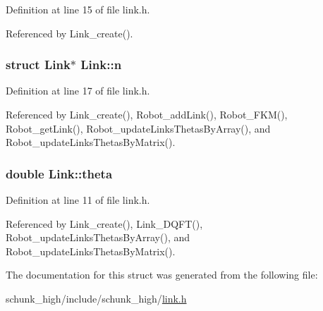 Definition at line 15 of file link.\-h.



Referenced by Link\-\_\-create().

\hypertarget{structLink_a185503cf680f8e9395c19c0521997c5c}{
\subsubsection[{n}]{\setlength{\rightskip}{0pt plus 5cm}struct {\bf Link}$\ast$ Link\-::n}}\label{structLink_a185503cf680f8e9395c19c0521997c5c}


Definition at line 17 of file link.\-h.



Referenced by Link\-\_\-create(), Robot\-\_\-add\-Link(), Robot\-\_\-\-F\-K\-M(), Robot\-\_\-get\-Link(), Robot\-\_\-update\-Links\-Thetas\-By\-Array(), and Robot\-\_\-update\-Links\-Thetas\-By\-Matrix().

\hypertarget{structLink_a88e705bc7fb6c7c8c7fa6987b52667d6}{
\subsubsection[{theta}]{\setlength{\rightskip}{0pt plus 5cm}double Link\-::theta}}\label{structLink_a88e705bc7fb6c7c8c7fa6987b52667d6}


Definition at line 11 of file link.\-h.



Referenced by Link\-\_\-create(), Link\-\_\-\-D\-Q\-F\-T(), Robot\-\_\-update\-Links\-Thetas\-By\-Array(), and Robot\-\_\-update\-Links\-Thetas\-By\-Matrix().



The documentation for this struct was generated from the following file\-:\begin{DoxyCompactItemize}
\item 
schunk\-\_\-high/include/schunk\-\_\-high/\hyperlink{link_8h}{link.\-h}\end{DoxyCompactItemize}
